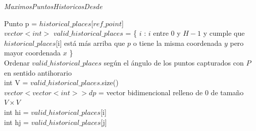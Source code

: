 \begin{algorithm}[H]
	\caption{\textit{MaximosPuntosHistoricosDesde}}
	Punto p = $historical\_places$[$ref\_point$] \\

    $vector<int>$ $valid\_historical\_places$ = \{ $i$ : $i$ entre 0 y $H-1$ y cumple que $historical\_places$[i] está más arriba que $p$ o tiene la misma coordenada $y$ pero mayor coordenada $x$ \} \\
    
    Ordenar $valid\_historical\_places$ según el ángulo de los puntos capturados con $P$ en sentido antihorario \\
    
    int V = $valid\_historical\_places$.size() \\
    $vector< vector<int> > dp$ = vector bidimencional relleno de 0 de tamaño $V \times V$ \\

     {
        int hi = $valid\_historical\_places$[i] \\
         {
            int hj = $valid\_historical\_places$[j] \\
        }
    }

\end{algorithm}


